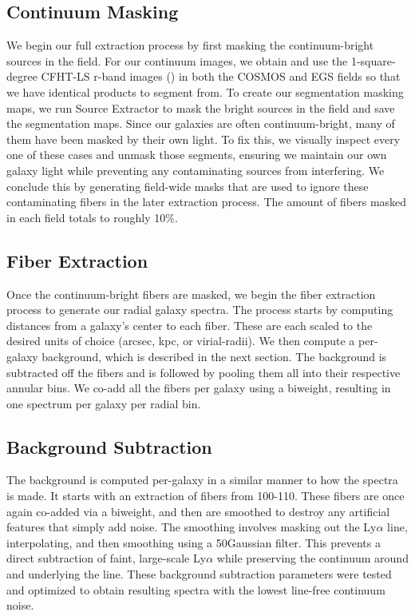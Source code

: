 \documentclass[linenumbers,amsmath,trackchanges,preprint2]{aastex702}
\begin{document}
\subsection{Continuum Masking}
\par We begin our full extraction process by first masking the continuum-bright sources in the field. For our continuum images, we obtain and use the 1-square-degree CFHT-LS r-band images (\cite{?}) in both the COSMOS and EGS fields so that we have identical products to segment from. To create our segmentation masking maps, we run Source Extractor to mask the bright sources in the field and save the segmentation maps. Since our galaxies are often continuum-bright, many of them have been masked by their own light. To fix this, we visually inspect every one of these cases and unmask those segments, ensuring we maintain our own galaxy light while preventing any contaminating sources from interfering. We conclude this by generating field-wide masks that are used to ignore these contaminating fibers in the later extraction process. The amount of fibers masked in each field totals to roughly 10\%. 

\subsection{Fiber Extraction}
\par Once the continuum-bright fibers are masked, we begin the fiber extraction process to generate our radial galaxy spectra. The process starts by computing distances from a galaxy's center to each fiber. These are each scaled to the desired units of choice (arcsec, kpc, or virial-radii). We then compute a per-galaxy background, which is described in the next section. The background is subtracted off the fibers and is followed by pooling them all into their respective annular bins. We co-add all the fibers per galaxy using a biweight, resulting in one spectrum per galaxy per radial bin.

\subsection{Background Subtraction}
\par The background is computed per-galaxy in a similar manner to how the spectra is made. It starts with an extraction of fibers from 100-110\arcsec. These fibers are once again co-added via a biweight, and then are smoothed to destroy any artificial features that simply add noise. The smoothing involves masking out the Ly$\alpha$ line, interpolating, and then smoothing using a 50\Ang Gaussian filter. This prevents a direct subtraction of faint, large-scale Ly$\alpha$ while preserving the continuum around and underlying the line. These background subtraction parameters were tested and optimized to obtain  resulting spectra with the lowest line-free continuum noise.
\end{document}

